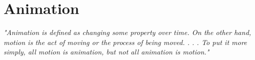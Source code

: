 %
%
% 
% 
% 


\chapter{Animation}

\label{chap:Animation}

{\em"Animation is defined as changing some property over time. On the other hand, motion is the act of moving or the process of being moved. . . .  To put it more simply, all motion is animation, but not all animation is motion."}\citep{head2016designing}